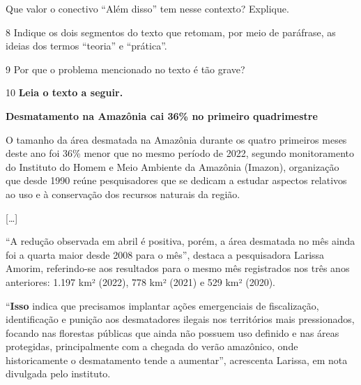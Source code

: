 Que valor o conectivo ``Além disso'' tem nesse contexto? Explique.


\num{8} Indique os dois segmentos do texto que retomam, por meio de
paráfrase, as ideias dos termos ``teoria'' e ``prática''.


\num{9} Por que o problema mencionado no texto é tão grave?


\num{10} \textbf{Leia o texto a seguir.}

\begin{myquote}
\centering\textbf{Desmatamento na Amazônia cai 36\% no primeiro quadrimestre}
\end{myquote}


\begin{myquote}
O tamanho da área desmatada na Amazônia durante os quatro primeiros
meses deste ano foi 36\% menor que no mesmo período de 2022, segundo
monitoramento do Instituto do Homem e Meio Ambiente da Amazônia
(Imazon), organização que desde 1990 reúne pesquisadores que se dedicam
a estudar aspectos relativos ao uso e à conservação dos recursos naturais
da região.
\end{myquote}

\begin{myquote}
{[}\ldots{]}
\end{myquote}

\begin{myquote}
``A redução observada em abril é positiva, porém, a área desmatada no
mês ainda foi a quarta maior desde 2008 para o mês'', destaca a
pesquisadora Larissa Amorim, referindo-se aos resultados para o mesmo
mês registrados nos três anos anteriores: 1.197 km² (2022), 778 km²
(2021) e 529 km² (2020).
\end{myquote}

\begin{myquote}
``\textbf{Isso} indica que precisamos implantar ações emergenciais de
fiscalização, identificação e punição aos desmatadores ilegais nos
territórios mais pressionados, focando nas florestas públicas que ainda
não possuem uso definido e nas áreas protegidas, principalmente com a
chegada do verão amazônico, onde historicamente o desmatamento tende a
aumentar'', acrescenta Larissa, em nota divulgada pelo instituto.
\end{myquote}

